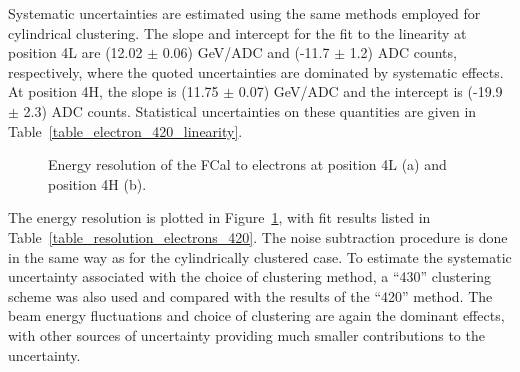 Systematic uncertainties are estimated using the same methods employed for cylindrical clustering. The slope and intercept for the fit to the linearity at position 4L are (12.02 $\pm$ 0.06) GeV/ADC and (-11.7 $\pm$ 1.2) ADC counts, respectively, where the quoted uncertainties are dominated by systematic effects. At position 4H, the slope is (11.75 $\pm$ 0.07) GeV/ADC and the intercept is (-19.9 $\pm$ 2.3) ADC counts. Statistical uncertainties on these quantities are given in Table~\ref{table_electron_420_linearity}.


\begin{figure}[!htb]
\begin{centering}
\caption[Electron energy resolution, topoclusters]{Energy resolution of the FCal to electrons at position 4L (a) and position 4H (b).} 
\label{electron_resolution_t420}
\end{centering}
\end{figure}

The energy resolution is plotted in Figure~\ref{electron_resolution_t420}, with fit results listed in Table~\ref{table_resolution_electrons_420}. The noise subtraction procedure is done in the same way as for the cylindrically clustered case. To estimate the systematic uncertainty associated with the choice of clustering method, a ``430'' clustering scheme was also used and compared with the results of the ``420'' method. The beam energy fluctuations and choice of clustering are again the dominant effects, with other sources of uncertainty providing much smaller contributions to the uncertainty. 




